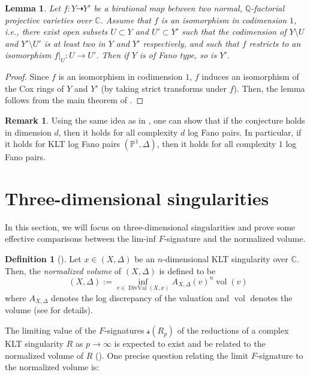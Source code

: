 \documentclass[11pt,reqno]{amsart}
\newcommand{\C}{\mathbb{C}}
\newcommand{\Q}{\mathbb{Q}}
\newcommand{\bP}{\mathbb{P}}
\DeclareMathOperator{\vol}{vol}
\DeclareMathOperator{\nvol}{\widehat{vol}}
\DeclareMathOperator{\DivVal}{DivVal}
\numberwithin{equation}{section}
\newtheorem{lem}[prop] {Lemma}
\theoremstyle{definition}
\newtheorem{rem}[prop] {Remark}
\newtheorem{defi}[prop] {Definition}
\newcommand{\s}{\mathscr{s}}
\begin{document}
\begin{lem} \label{codimensiontwolemma}
    Let $f: Y \dashrightarrow Y'$ be a birational map between two normal, $\Q$-factorial projective varieties over $\C$.
    Assume that $f$ is an isomorphism in codimension $1$, i.e., there exist open subsets $U \subset Y$ and $U' \subset Y'$ such that the codimension of $Y \setminus U$ and $Y' \setminus U'$ is at least two in $Y$ and $Y'$ respectively, and such that $f$ restricts to an isomorphism $f|_U : U \to U'$. Then if $Y$ is of Fano type, so is $Y'$.
\end{lem}

\begin{proof}
        Since $f$ is an isomorphism in codimension $1$, $f$ induces an isomorphism of the Cox rings of $Y$ and $Y'$ (by taking strict transforms under $f$). Then, the lemma follows from the main theorem of \cite[Theorem~1.1]{GongyoOkawaSannaiTakagiCoxRings}.
\end{proof}

\begin{rem}
Using the same idea as in , one can show that if the conjecture holds in dimension $d$, then it holds for all complexity $d$ log Fano pairs. In particular, if it holds for KLT log Fano pairs $(\bP^1, \Delta)$, then it holds for all complexity $1$ log Fano pairs.
\end{rem}

\section{Three-dimensional singularities} \label{section:threefolds}

In this section, we will focus on three-dimensional singularities and prove some effective comparisons between the lim-inf $F$-signature and the normalized volume.

\begin{defi}[\cite{LiMinimizingNormalizedVolumes}]
\label{defi:normalizedvolume}
Let $x \in (X, \Delta)$ be an $n$-dimensional KLT singularity over $\C$. Then, the \emph{normalized volume} of $(X, \Delta)$ is defined to be
\[ \nvol(X, \Delta) := \inf_{ v \in \DivVal(X,x)} A_{X, \Delta} (v)^n \vol(v)\]
where $A_{X, \Delta}$ denotes the log discrepancy of the valuation and $\vol$ denotes the volume (see \cite{MustataJonssonValuations} for details).
\end{defi}

The limiting value of the $F$-signatures $\s(R_p)$ of the reductions of a complex KLT singularity $R$ as $ p \to \infty$ is expected to exist and be related to the normalized volume of $R$ (). One precise question relating the limit $F$-signature to the normalized volume is:
\end{document}

